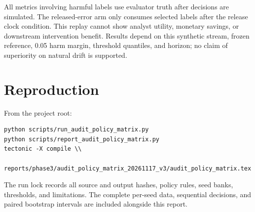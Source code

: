 \documentclass[10pt]{article}
\begin{document}
All metrics involving harmful labels use evaluator truth after decisions are simulated. The released-error arm only consumes selected labels after the release clock condition. This replay cannot show analyst utility, monetary savings, or downstream intervention benefit. Results depend on this synthetic stream, frozen reference, 0.05 harm margin, threshold quantiles, and horizon; no claim of superiority on natural drift is supported.
\section{Reproduction}
From the project root:
\begin{verbatim}
python scripts/run_audit_policy_matrix.py
python scripts/report_audit_policy_matrix.py
tectonic -X compile \\
  reports/phase3/audit_policy_matrix_20261117_v3/audit_policy_matrix.tex
\end{verbatim}
The run lock records all source and output hashes, policy rules, seed banks, thresholds, and limitations. The complete per-seed data, sequential decisions, and paired bootstrap intervals are included alongside this report.
\end{document}
